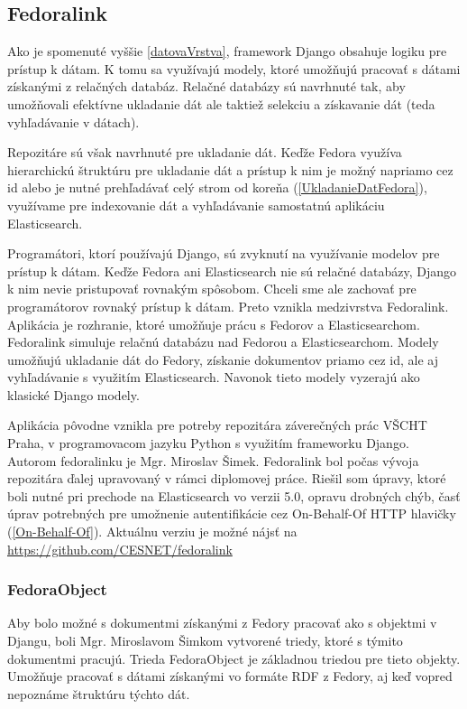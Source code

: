 \documentclass[thesis=M,slovak]{FITthesis}[2013/05/06]
\begin{document}
\subsection{Fedoralink}
Ako je spomenuté vyššie \ref{datovaVrstva}, framework Django obsahuje logiku pre prístup k dátam. K tomu sa využívajú modely, ktoré umožňujú pracovať s dátami získanými z relačných databáz. Relačné databázy sú navrhnuté tak, aby umožňovali efektívne ukladanie dát ale taktiež selekciu a získavanie dát (teda vyhľadávanie v dátach).

Repozitáre sú však navrhnuté pre ukladanie dát. Keďže Fedora využíva hierarchickú štruktúru pre ukladanie dát a prístup k nim je možný napriamo cez id alebo je nutné prehľadávať celý strom od koreňa (\ref{UkladanieDatFedora}), využívame pre indexovanie dát a vyhľadávanie samostatnú aplikáciu Elasticsearch.

Programátori, ktorí používajú Django, sú zvyknutí na využívanie modelov pre prístup k dátam. Keďže Fedora ani Elasticsearch nie sú relačné databázy, Django k nim nevie pristupovať rovnakým spôsobom. Chceli sme ale zachovať pre programátorov rovnaký prístup k dátam. Preto vznikla medzivrstva Fedoralink. Aplikácia je rozhranie, ktoré umožňuje prácu s Fedorov a Elasticsearchom. Fedoralink simuluje relačnú databázu nad Fedorou a Elasticsearchom. Modely umožňujú ukladanie dát do Fedory, získanie dokumentov priamo cez id, ale aj vyhľadávanie s využitím Elasticsearch. Navonok tieto modely vyzerajú ako klasické Django modely.

Aplikácia pôvodne vznikla pre potreby repozitára záverečných prác VŠCHT Praha, v programovacom jazyku Python s využitím frameworku Django. Autorom fedoralinku je Mgr. Miroslav Šimek. Fedoralink bol počas vývoja repozitára ďalej upravovaný v rámci diplomovej práce. Riešil som úpravy, ktoré boli nutné pri prechode na Elasticsearch vo verzii 5.0, opravu drobných chýb, časť úprav potrebných pre umožnenie autentifikácie cez On-Behalf-Of HTTP hlavičky (\ref{On-Behalf-Of}). Aktuálnu verziu je možné nájsť na \url{https://github.com/CESNET/fedoralink}

\subsubsection{FedoraObject}
Aby bolo možné s dokumentmi získanými z Fedory pracovať ako s objektmi v Djangu, boli Mgr. Miroslavom Šimkom vytvorené triedy, ktoré s týmito dokumentmi pracujú. Trieda FedoraObject je základnou triedou pre tieto objekty. Umožňuje pracovať s dátami získanými vo formáte RDF z Fedory, aj keď vopred nepoznáme štruktúru týchto dát.
\end{document}
